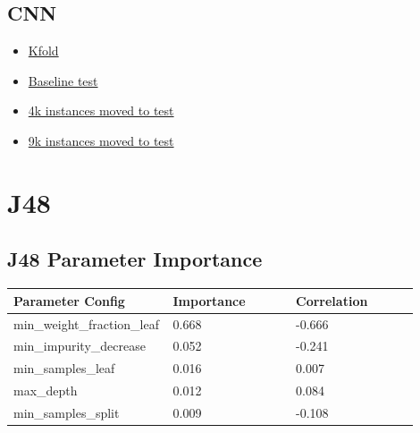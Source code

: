 \documentclass[11pt]{article}
\begin{document}
\subsection{CNN}
\begin{itemize}
  \item \href{https://wandb.ai/supervisedlearning/CNN%20All%20kf%20experiments/table?workspace=user-samfh}{Kfold}
  \item \href{https://wandb.ai/supervisedlearning/CNN%20all%20test%20set%20experiments?workspace=user-samfh }{Baseline test}
  \item \href{https://wandb.ai/supervisedlearning/CNN%20all%204000%20moved%20to%20test%20experiments?workspace=user-samfh}{4k instances moved to test}
  \item \href{https://wandb.ai/supervisedlearning/CNN%20all%209000%20moved%20to%20test%20experiments?workspace=user-samfh}{9k instances moved to test}

\end{itemize}

\newpage
\section{J48}

\subsection{J48 Parameter Importance}
  \begin{table}[ht]
    \centering
    \begin{tabular}{|p{0.3\linewidth} | p{0.3\linewidth}| p{0.3\linewidth}|} 
      \hline
      \textbf{Parameter Config}  & \textbf{Importance} & \textbf{Correlation} \\ \hline
        min\_weight\_fraction\_leaf & 0.668  & -0.666 \\ \hline
        min\_impurity\_decrease & 0.052 & -0.241 \\ \hline
        min\_samples\_leaf & 0.016 & 0.007 \\ \hline
        max\_depth & 0.012 & 0.084 \\ \hline
        min\_samples\_split & 0.009 & -0.108 \\ \hline

    \end{tabular}
  \end{table}\label{J48_ParamImp1}
\end{document}
